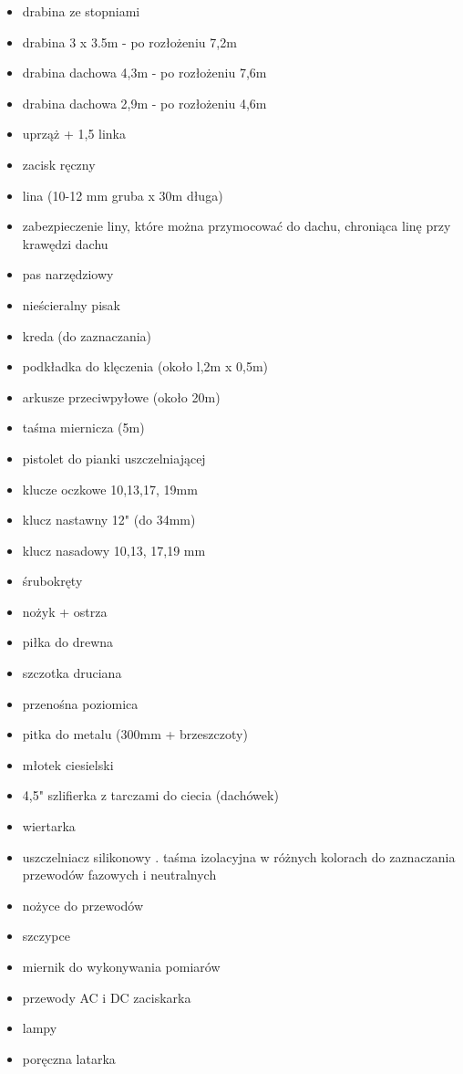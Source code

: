 \documentclass[12pt,a4paper]{article}
\begin{document}
\begin{itemize}
\item drabina ze stopniami 
\item drabina 3 x 3.5m - po rozłożeniu 7,2m 
\item drabina dachowa 4,3m - po rozłożeniu 7,6m 
\item drabina dachowa 2,9m - po rozłożeniu 4,6m 
\item uprząż + 1,5 linka 
\item zacisk ręczny 
\item lina (10-12 mm gruba x 30m długa) 
\item zabezpieczenie liny, które można przymocować do dachu, chroniąca 
linę przy krawędzi dachu 
\item pas narzędziowy 
\item nieścieralny pisak 
\item kreda (do zaznaczania) 
\item podkładka do klęczenia (około l,2m x 0,5m) 
\item arkusze przeciwpyłowe (około 20m) 
\item taśma miernicza (5m) 
\item pistolet do pianki uszczelniającej 
\item klucze oczkowe 10,13,17, 19mm 
\item klucz nastawny 12" (do 34mm) 
\item klucz nasadowy 10,13, 17,19 mm 
\item śrubokręty 
\item nożyk + ostrza 
\item piłka do drewna 
\item szczotka druciana 
\item przenośna poziomica 
\item pitka do metalu (300mm + brzeszczoty) 
\item młotek ciesielski 
\item 4,5" szlifierka z tarczami do ciecia (dachówek) 
\item wiertarka 
\item uszczelniacz silikonowy . taśma izolacyjna w różnych kolorach do 
zaznaczania przewodów fazowych i neutralnych 
\item nożyce do przewodów 
\item szczypce 
\item miernik do wykonywania pomiarów 
\item przewody AC i DC zaciskarka 
\item lampy 
\item poręczna latarka 

\end{itemize}
\end{document}
